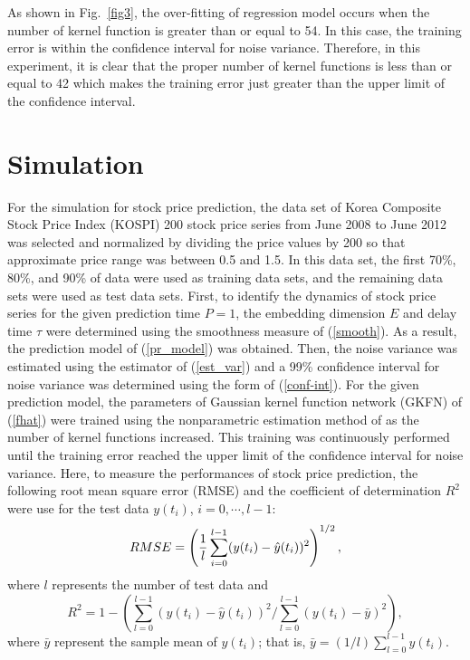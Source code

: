 \documentclass[runningheads,a4paper]{llncs}
\begin{document}
As shown in Fig.~\ref{fig3}, the over-fitting of regression model occurs when the number of kernel function is greater than or
equal to 54. In this case, the training error is within the confidence interval for noise variance. Therefore, in this experiment,
it is clear that the proper number of kernel functions is less than or equal to 42 which makes the training error just greater than
the upper limit of the confidence interval.

\section{Simulation}

For the simulation for stock price prediction, the data set of  Korea Composite Stock Price Index (KOSPI) 200 stock price series from June 2008 to June 2012 was
selected and normalized by dividing the price values by 200 so that approximate price range was between 0.5 and 1.5. In this data set, the first 70\%, 80\%, and 90\%
of data were used as training data sets, and the remaining data sets were used as test data sets. First, to identify the dynamics of stock price series for the given
prediction time $P=1$, the embedding dimension $E$ and delay time $\tau$ were determined using the smoothness measure of (\ref{smooth}). As a result, the prediction
model of (\ref{pr_model}) was obtained. Then, the noise variance was estimated using the estimator of (\ref{est_var}) and a 99\% confidence interval
for noise variance was determined using the form of (\ref{conf-int}). For the given prediction model, the parameters of Gaussian kernel function network (GKFN) of (\ref{fhat})
were trained using the nonparametric estimation method of \cite{Kil93} as the number of kernel functions increased. This training was continuously performed
until the training error reached the upper limit of the confidence interval for noise variance. Here, to measure the performances of stock price prediction, the following root mean square error
(RMSE) and the coefficient of determination $R^2$ were use for the test data $y(t_i)$, $i= 0, \cdots, l-1$:
\begin{equation}
RMSE = \left({1\over l}\sum_{i=0}^{l-1}(y(t_i) - \hat{y}(t_i))^2\right)^{1/2},
\end{equation}
where $l$ represents the number of test data and
\begin{equation}
R^2 = 1 - \left(\sum_{l=0}^{l-1}(y(t_i) - \hat{y}(t_i))^2/\sum_{l=0}^{l-1}(y(t_i) - \bar{y})^2\right),
\end{equation}
where $\bar{y}$ represent the sample mean of $y(t_i)$; that is, $\bar{y} = (1/l)\sum_{l=0}^{l-1}y(t_i)$.
\end{document}
